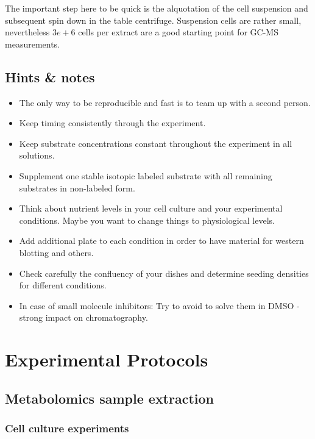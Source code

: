 \documentclass[]{book}
\providecommand{\tightlist}{%
  \setlength{\itemsep}{0pt}\setlength{\parskip}{0pt}}
\theoremstyle{definition}
\theoremstyle{definition}
\theoremstyle{definition}
\theoremstyle{remark}
\begin{document}
The important step here to be quick is the alquotation of the cell
suspension and subsequent spin down in the table centrifuge. Suspension
cells are rather small, nevertheless \(3e+6\) cells per extract are a
good starting point for GC-MS measurements.

\section{Hints \& notes}\label{hints-notes}

\begin{itemize}
\tightlist
\item
  The only way to be reproducible and fast is to team up with a second
  person.
\item
  Keep timing consistently through the experiment.
\item
  Keep substrate concentrations constant throughout the experiment in
  all solutions.
\item
  Supplement one stable isotopic labeled substrate with all remaining
  substrates in non-labeled form.
\item
  Think about nutrient levels in your cell culture and your experimental
  conditions. Maybe you want to change things to physiological levels.
\item
  Add additional plate to each condition in order to have material for
  western blotting and others.
\item
  Check carefully the confluency of your dishes and determine seeding
  densities for different conditions.
\item
  In case of small molecule inhibitors: Try to avoid to solve them in
  DMSO - strong impact on chromatography.
\end{itemize}

\chapter{Experimental Protocols}\label{protocols}

\section{Metabolomics sample extraction}\label{extraction}

\subsection{Cell culture experiments}\label{cell-culture-experiments}
\end{document}

